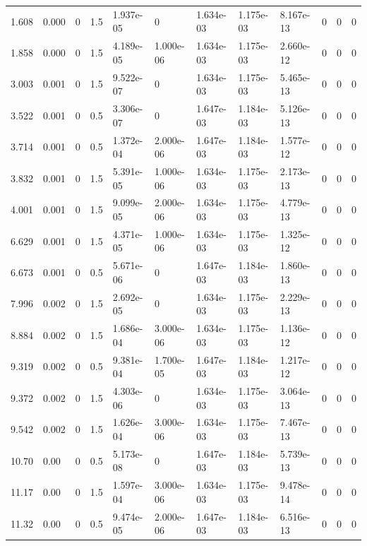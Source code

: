 \documentclass[preview]{standalone}
\begin{document}
{{\begin{tabular}{L{1.2cm}C{1.2cm} C{0.3cm}C{0.5cm} C{1.4cm}C{1.4cm} C{1.4cm}C{1.4cm} C{1.6cm}C{1.6cm} C{1.6cm}C{1.6cm}}
  1.608  &  0.000  & 0     & 1.5 &  1.937e-05  & 0  &  1.634e-03&   1.175e-03& 8.167e-13 & 0   &  0 & 0  \\ 
  1.858  &  0.000  & 0     & 1.5 &  4.189e-05  & 1.000e-06  &  1.634e-03&   1.175e-03& 2.660e-12 & 0   &  0 & 0  \\ 
  3.003  &  0.001  & 0     & 1.5 &  9.522e-07  & 0  &  1.634e-03&   1.175e-03& 5.465e-13 & 0   &  0 & 0  \\ 
  3.522  &  0.001  & 0     & 0.5 &  3.306e-07  & 0  &  1.647e-03&   1.184e-03& 5.126e-13 & 0   &  0 & 0  \\ 
  3.714  &  0.001  & 0     & 0.5 &  1.372e-04  & 2.000e-06  &  1.647e-03&   1.184e-03& 1.577e-12 & 0   &  0 & 0  \\ 
  3.832  &  0.001  & 0     & 1.5 &  5.391e-05  & 1.000e-06  &  1.634e-03&   1.175e-03& 2.173e-13 & 0   &  0 & 0  \\ 
  4.001  &  0.001  & 0     & 1.5 &  9.099e-05  & 2.000e-06  &  1.634e-03&   1.175e-03& 4.779e-13 & 0   &  0 & 0  \\ 
  6.629  &  0.001  & 0     & 1.5 &  4.371e-05  & 1.000e-06  &  1.634e-03&   1.175e-03& 1.325e-12 & 0   &  0 & 0  \\ 
  6.673  &  0.001  & 0     & 0.5 &  5.671e-06  & 0  &  1.647e-03&   1.184e-03& 1.860e-13 & 0   &  0 & 0  \\ 
  7.996  &  0.002  & 0     & 1.5 &  2.692e-05  & 0  &  1.634e-03&   1.175e-03& 2.229e-13 & 0   &  0 & 0  \\ 
  8.884  &  0.002  & 0     & 1.5 &  1.686e-04  & 3.000e-06  &  1.634e-03&   1.175e-03& 1.136e-12 & 0   &  0 & 0  \\ 
  9.319  &  0.002  & 0     & 0.5 &  9.381e-04  & 1.700e-05  &  1.647e-03&   1.184e-03& 1.217e-12 & 0   &  0 & 0  \\ 
  9.372  &  0.002  & 0     & 1.5 &  4.303e-06  & 0  &  1.634e-03&   1.175e-03& 3.064e-13 & 0   &  0 & 0  \\ 
  9.542  &  0.002  & 0     & 1.5 &  1.626e-04  & 3.000e-06  &  1.634e-03&   1.175e-03& 7.467e-13 & 0   &  0 & 0  \\ 
  10.70  &  0.00  & 0     & 0.5 &  5.173e-08  & 0  &  1.647e-03&   1.184e-03& 5.739e-13 & 0   &  0 & 0  \\ 
  11.17  &  0.00  & 0     & 1.5 &  1.597e-04  & 3.000e-06  &  1.634e-03&   1.175e-03& 9.478e-14 & 0   &  0 & 0  \\ 
  11.32  &  0.00  & 0     & 0.5 &  9.474e-05  & 2.000e-06  &  1.647e-03&   1.184e-03& 6.516e-13 & 0   &  0 & 0  \\ 

\end{tabular}}}
\end{document}
